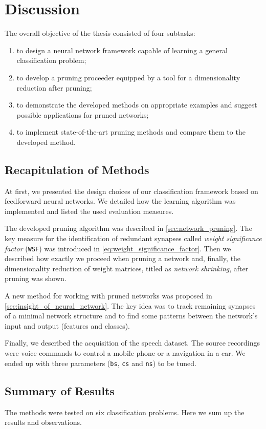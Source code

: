 \chapter{Discussion} \label{chap:discussion}
The overall objective of the thesis consisted of four subtasks:

\begin{enumerate}
\item to design a neural network framework capable of learning a general classification problem;
\item to develop a pruning proceeder equipped by a tool for a dimensionality reduction after pruning;
\item to demonstrate the developed methods on appropriate examples and suggest possible applications for pruned networks;
\item to implement state-of-the-art pruning methods and compare them to the developed method.
\end{enumerate}

\section{Recapitulation of Methods} \label{sec:recapitulation_of_methods}
At first, we presented the design choices of our classification framework based on feedforward neural networks. We detailed how the learning algorithm was implemented and listed the used evaluation measures.

The developed pruning algorithm was described in \cref{sec:network_pruning}. The key measure for the identification of redundant synapses called \textit{weight significance factor} (\texttt{WSF}) was introduced in \cref{eq:weight_significance_factor}. Then we described how exactly we proceed when pruning a network and, finally, the dimensionality reduction of weight matrices, titled as \textit{network shrinking}, after pruning was shown.

A new method for working with pruned networks was proposed in \cref{sec:insight_of_neural_network}. The key idea was to track remaining synapses of a minimal network structure and to find some patterns between the network's input and output (features and classes).

Finally, we described the acquisition of the speech dataset. The source recordings were voice commands to control a mobile phone or a navigation in a car. We ended up with three parameters (\texttt{bs}, \texttt{cs} and \texttt{ns}) to be tuned.

\section{Summary of Results} \label{sec:summary_of_results}
The methods were tested on six classification problems. Here we sum up the results and observations.

